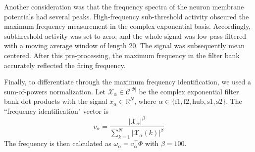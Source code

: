 \documentclass[11pt]{article}
\begin{document}


Another consideration was that the frequency spectra of the neuron membrane potentials had several peaks.  High-frequency sub-threshold activity obscured the maximum frequency measurement in the complex exponential basis.  Accordingly, subthreshold activity was set to zero, and the whole signal was low-pass filtered with a moving average window of length 20.  The signal was subsequently mean centered.  After this pre-processing, the maximum frequency in the filter bank accurately reflected the firing frequency.

Finally, to differentiate through the maximum frequency identification, we used a sum-of-powers normalization.  Let $\mathcal{X}_\alpha \in \mathcal{C}^{|\Phi|}$ be the complex exponential filter bank dot products with the signal $x_\alpha \in \mathbb{R}^{N}$, where $\alpha \in \{ \text{f1}, \text{f2}, \text{hub}, \text{s1}, \text{s2} \}$.  The ``frequency identification" vector is 
\begin{equation}
v_\alpha = \frac{|\mathcal{X}_\alpha|^\beta}{\sum_{k=1}^N |\mathcal{X}_\alpha(k)|^\beta}
\end{equation}
The frequency is then calculated as $\omega_\alpha = v_\alpha^\top \Phi$ with $\beta = 100$.
\end{document}
